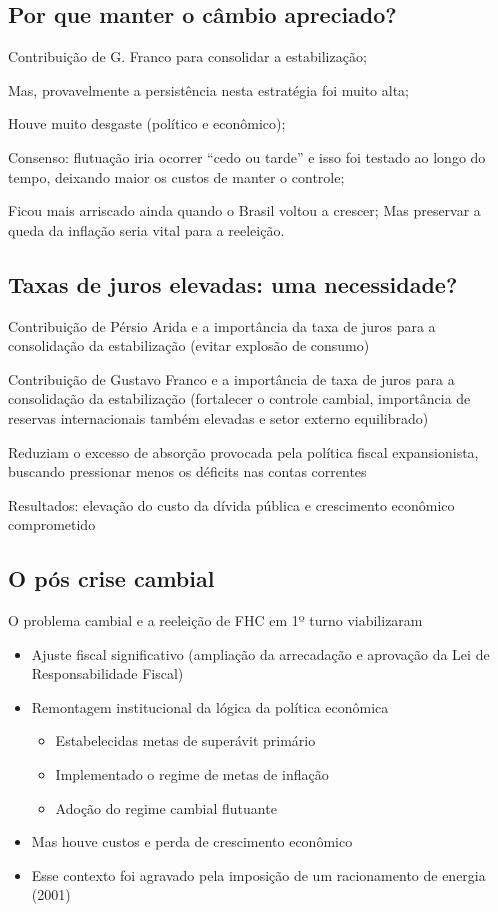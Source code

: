 \documentclass[a4paper,12pt]{article}[abntex2]
\begin{document}
\subsection{\textbf{Por que manter o câmbio apreciado?}}
Contribuição de G. Franco para consolidar a estabilização;

Mas, provavelmente a persistência nesta estratégia foi muito alta;

Houve muito desgaste (político e econômico);

Consenso: flutuação iria ocorrer “cedo ou tarde” e isso foi testado ao longo do tempo, deixando maior os custos de manter o controle;

Ficou mais arriscado ainda quando o Brasil voltou a crescer;
Mas preservar a queda da inflação seria vital para a reeleição.

\subsection{\textbf{Taxas de juros elevadas: uma necessidade?}}
Contribuição de Pérsio Arida e a importância da taxa de juros para a consolidação da estabilização (evitar explosão de consumo)

Contribuição de Gustavo Franco e a importância de taxa de juros para a consolidação da estabilização (fortalecer o controle cambial, importância de reservas internacionais também elevadas e setor externo equilibrado)

Reduziam o excesso de absorção provocada pela política fiscal expansionista, buscando pressionar menos os déficits nas contas correntes

Resultados: elevação do custo da dívida pública e crescimento econômico comprometido

\subsection{\textbf{O pós crise cambial}}

O problema cambial e a reeleição de FHC em 1º turno viabilizaram\begin{itemize}
    \item Ajuste fiscal significativo (ampliação da arrecadação e aprovação da Lei de Responsabilidade Fiscal)
    \item Remontagem institucional da lógica da política econômica\begin{itemize}
        \item Estabelecidas metas de superávit primário
        \item Implementado o regime de metas de inflação
        \item Adoção do regime cambial flutuante
    \end{itemize}
    \item Mas houve custos e perda de crescimento econômico
    \item Esse contexto foi agravado pela imposição de um racionamento de energia (2001)
\end{itemize}
\end{document}

